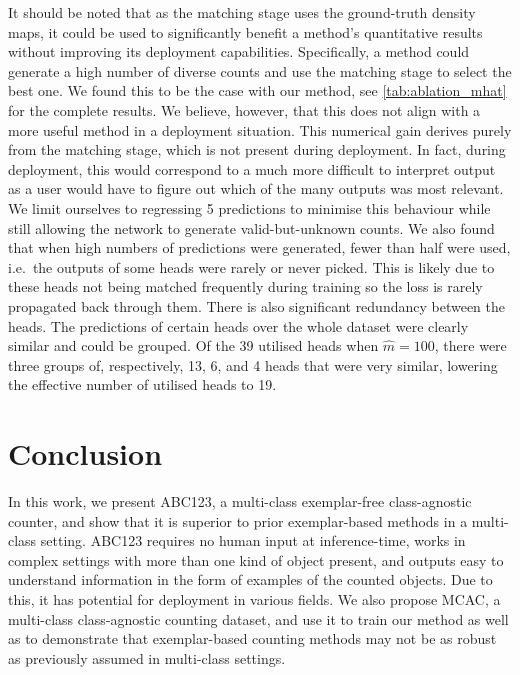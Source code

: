 \documentclass[runningheads]{llncs}
\begin{document}
It should be noted that as the matching stage uses the ground-truth density maps, it could be used to significantly benefit a method's quantitative results without improving its deployment capabilities.
Specifically, a method could 
generate a high number of diverse counts and use the matching stage to select the best one. 
We found this to be the case with our method,  see \cref{tab:ablation_mhat} for the complete results.
We believe, however, that this does not align with a more useful method in a deployment situation. This numerical gain derives purely from the matching stage, which is not present during deployment. In fact, during deployment, this would correspond to a much more difficult to interpret output as a user would have to figure out which of the many outputs was most relevant.
We limit ourselves to regressing 5 predictions to minimise this behaviour while still allowing the network to generate valid-but-unknown counts. 
We also found that when high numbers of predictions were generated, fewer than half were used, i.e.\ the outputs of some heads were rarely or never picked. This is likely due to these heads not being matched frequently during training so the loss is rarely propagated back through them. There is also significant redundancy between the heads. The predictions of certain heads over the whole dataset were clearly similar and could be grouped. Of the 39 utilised heads when $\hat{m} = 100$, there were three groups of, respectively, 13, 6, and 4 heads that were very similar, lowering the effective number of utilised heads to 19. 

\begin{table}
    \centering
    \caption{\textbf{Effect of using more prediction heads.} Increasing the number of pre-matching predictions improves the quantitative results of our method. However, as the number of heads increases, the percentage of heads that are frequently ($>0.4\%$) matched decreases.}
    \fontsize{9}{9}\selectfont
    
    \label{tab:ablation_mhat}
\end{table}

\section{Conclusion}
\label{conclusion}
In this work, we present ABC123, a multi-class exemplar-free class-agnostic counter, and show that it is superior to prior exemplar-based methods in a multi-class setting.
ABC123 requires no human input at inference-time, works in complex  settings with more than one kind of object present, and outputs easy to understand information in the form of examples of the counted objects.
Due to this, it has potential for deployment in various fields.
We also propose MCAC, a multi-class class-agnostic counting dataset, and use it to train our method as well as to demonstrate that exemplar-based counting methods may not be as robust as previously assumed in multi-class settings. 

%
%

\clearpage
\clearpage
\clearpage
\clearpage


\end{document}
